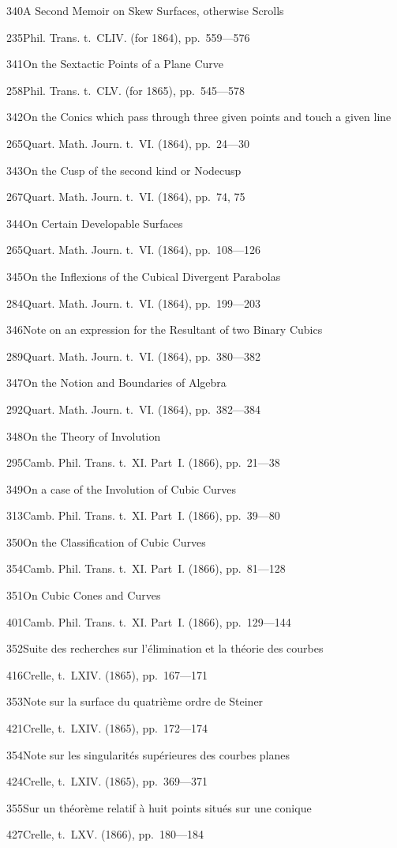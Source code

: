 \documentclass[11pt,a4paper]{book}
\providecommand{\tocentry}[2]{#1\dotfill #2\par}
\begin{document}
\tocentry{340}{A Second Memoir on Skew Surfaces, otherwise Scrolls}{235}{Phil. Trans. t.~CLIV. (for 1864), pp.~559---576}

\tocentry{341}{On the Sextactic Points of a Plane Curve}{258}{Phil. Trans. t.~CLV. (for 1865), pp.~545---578}

\tocentry{342}{On the Conics which pass through three given points and touch a given line}{265}{Quart. Math. Journ. t.~VI. (1864), pp.~24---30}

\tocentry{343}{On the Cusp of the second kind or Nodecusp}{267}{Quart. Math. Journ. t.~VI. (1864), pp.~74, 75}

\tocentry{344}{On Certain Developable Surfaces}{265}{Quart. Math. Journ. t.~VI. (1864), pp.~108---126}

\tocentry{345}{On the Inflexions of the Cubical Divergent Parabolas}{284}{Quart. Math. Journ. t.~VI. (1864), pp.~199---203}

\tocentry{346}{Note on an expression for the Resultant of two Binary Cubics}{289}{Quart. Math. Journ. t.~VI. (1864), pp.~380---382}

\tocentry{347}{On the Notion and Boundaries of Algebra}{292}{Quart. Math. Journ. t.~VI. (1864), pp.~382---384}

\tocentry{348}{On the Theory of Involution}{295}{Camb. Phil. Trans. t.~XI. Part~I. (1866), pp.~21---38}

\tocentry{349}{On a case of the Involution of Cubic Curves}{313}{Camb. Phil. Trans. t.~XI. Part~I. (1866), pp.~39---80}

\tocentry{350}{On the Classification of Cubic Curves}{354}{Camb. Phil. Trans. t.~XI. Part~I. (1866), pp.~81---128}

\tocentry{351}{On Cubic Cones and Curves}{401}{Camb. Phil. Trans. t.~XI. Part~I. (1866), pp.~129---144}

\newpage

\tocentry{352}{Suite des recherches sur l'\'{e}limination et la th\'{e}orie des courbes}{416}{Crelle, t.~LXIV. (1865), pp.~167---171}

\tocentry{353}{Note sur la surface du quatri\`{e}me ordre de Steiner}{421}{Crelle, t.~LXIV. (1865), pp.~172---174}

\tocentry{354}{Note sur les singularit\'{e}s sup\'{e}rieures des courbes planes}{424}{Crelle, t.~LXIV. (1865), pp.~369---371}

\tocentry{355}{Sur un th\'{e}or\`{e}me relatif \`{a} huit points situ\'{e}s sur une conique}{427}{Crelle, t.~LXV. (1866), pp.~180---184}
\end{document}
